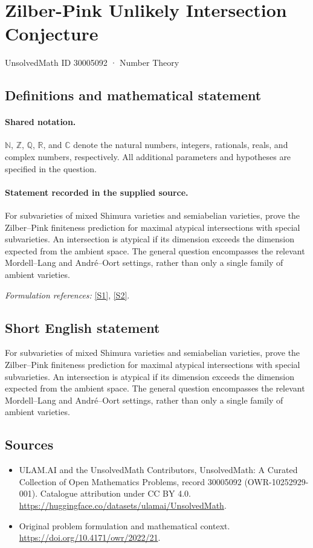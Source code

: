 \documentclass[11pt]{article}
\newcommand{\sref}[2]{\hyperlink{source:#1:#2}{[S#2]}}
\begin{document}
\setcounter{section}{30005091}
\section{Zilber-Pink Unlikely Intersection Conjecture}\label{30005092}
{\small UnsolvedMath ID 30005092 · Number Theory}
\subsection{Definitions and mathematical statement}

\paragraph{Shared notation.}$\mathbb N$, $\mathbb Z$, $\mathbb Q$, $\mathbb R$, and $\mathbb C$ denote the natural numbers, integers, rationals, reals, and complex numbers, respectively. All additional parameters and hypotheses are specified in the question.


\paragraph{Statement recorded in the supplied source.}
For subvarieties of mixed Shimura varieties and semiabelian varieties, prove the Zilber--Pink finiteness prediction for maximal atypical intersections with special subvarieties. An intersection is atypical if its dimension exceeds the dimension expected from the ambient space. The general question encompasses the relevant Mordell--Lang and Andr\'e--Oort settings, rather than only a single family of ambient varieties.
\par\smallskip\textit{Formulation references:} \sref{30005092}{1}, \sref{30005092}{2}.
\subsection{Short English statement}
For subvarieties of mixed Shimura varieties and semiabelian varieties, prove the Zilber--Pink finiteness prediction for maximal atypical intersections with special subvarieties. An intersection is atypical if its dimension exceeds the dimension expected from the ambient space. The general question encompasses the relevant Mordell--Lang and Andr\'e--Oort settings, rather than only a single family of ambient varieties.
\subsection{Sources}
\begin{itemize}
\item[\hypertarget{source:30005092:1}{S1}] ULAM.AI and the UnsolvedMath Contributors, UnsolvedMath: A Curated Collection of Open Mathematics Problems, record 30005092 (OWR-10252929-001). Catalogue attribution under CC BY 4.0.
\url{https://huggingface.co/datasets/ulamai/UnsolvedMath}.
\item[\hypertarget{source:30005092:2}{S2}] Original problem formulation and mathematical context.
\url{https://doi.org/10.4171/owr/2022/21}.
\end{itemize}
\label{end:30005092}
\end{document}
